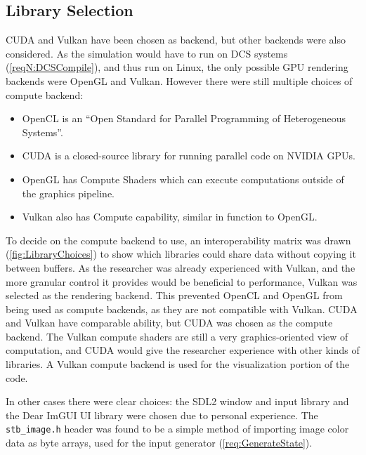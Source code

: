 \subsection{Library Selection}
\label{sec:LibrarySelection}

CUDA and Vulkan have been chosen as backend, but other backends were also considered.
As the simulation would have to run on DCS systems (\cref{reqN:DCSCompile}), and thus run on Linux, the only possible GPU rendering backends were OpenGL and Vulkan.
However there were still multiple choices of compute backend:
\begin{itemize}
    \item OpenCL\cite{tool:OpenCL1.0PressRelease} is an ``Open Standard for Parallel Programming of Heterogeneous Systems''\cite{TheKhronosGroupOpenCLInc}.
    \item CUDA\cite{tool:CUDA} is a closed-source library for running parallel code on NVIDIA GPUs.
    \item OpenGL has Compute Shaders\cite{tool:OpenGLComputeShaderExt} which can execute computations outside of the graphics pipeline.
    \item Vulkan also has Compute capability\cite{TheKhronosGroupVulkanGuide}, similar in function to OpenGL.
\end{itemize}
To decide on the compute backend to use, an interoperability matrix was drawn (\cref{fig:LibraryChoices}) to show which libraries could share data without copying it between buffers.
As the researcher was already experienced with Vulkan, and the more granular control it provides would be beneficial to performance, Vulkan was selected as the rendering backend.
This prevented OpenCL and OpenGL from being used as compute backends, as they are not compatible with Vulkan.
CUDA and Vulkan have comparable ability, but CUDA was chosen as the compute backend.
The Vulkan compute shaders are still a very graphics-oriented view of computation, and CUDA would give the researcher experience with other kinds of libraries.
A Vulkan compute backend is used for the visualization portion of the code.


In other cases there were clear choices: the SDL2\cite{SimpleHomepage} window and input library and the Dear ImGUI\cite{CornutDearImGui} UI library were chosen due to personal experience.
The \texttt{stb\_image.h} header was found to be a simple method of importing image color data as byte arrays, used for the input generator (\cref{req:GenerateState}).

